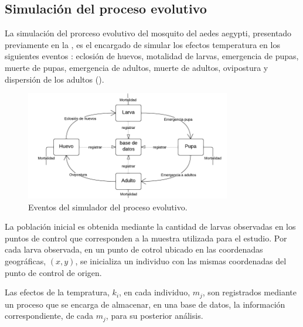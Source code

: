 \subsection{Simulación del proceso evolutivo}
La simulación del prorceso evolutivo del mosquito del aedes aegypti, presentado previamente en la
, es el encargado de simular los efectos temperatura
en los siguientes eventos : eclosión de huevos, motalidad de larvas, emergencia de pupas, muerte
de pupas, emergencia de adultos, muerte de adultos, ovipostura y dispersión de los adultos
().

\begin{figure}
\centering
\includegraphics[width=0.8\textwidth]{capitulo-5/graphics/proceso-evolutivo.png}
\caption{\label{fig:cap-5-proceso-evolutivo} Eventos del simulador del proceso evolutivo.}
\end{figure}

La población inicial es obtenida mediante la cantidad de larvas observadas en los puntos de
control que corresponden a la muestra utilizada para el estudio. Por cada larva observada,
en un punto de cotrol ubicado en las coordenadas geográficas, $(x, y)$, se inicializa un individuo
con las mismas coordenadas del punto de control de origen.

Las efectos de la tempratura, $k_{i}$, en cada individuo, $m_{j}$, son registrados mediante un
proceso que se encarga de almacenar, en una base de datos, la información correspondiente, de cada
$m_{j}$, para su posterior análisis.
